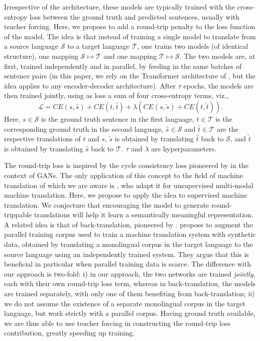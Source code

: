 \documentclass[11pt,a4paper]{article}
\begin{document}
Irrespective of the architecture, these models are typically trained with the cross-entropy loss between the ground truth and predicted sentences, usually with teacher forcing.
Here, we propose to add a round-trip penalty to the loss function of the model. The idea is that instead of training a single model to translate from a source language $\mathcal{S}$ to a target language $\mathcal{T}$, one trains two models (of identical structure), one mapping $\mathcal{S}\mapsto \mathcal{T}$ and one mapping $\mathcal{T}\mapsto \mathcal{S}$. The two models are, at first, trained independently and in parallel, by feeding in the same batches of sentence pairs (in this paper, we rely on the Transformer architecture of \citet{transformer}, but the idea applies to any encoder-decoder architecture). After $\tau$ epochs, the models are then trained jointly, using as loss a sum of four cross-entropy terms, viz.,
\begin{equation}
\mathcal{L} = CE(s, \hat{s}) + CE(t, \hat{t}) + \lambda \left( CE(s, \tilde{s}) + CE(t, \tilde{t})\right).
\label{eq:RTL}
\end{equation}
Here, $s\in\mathcal{S}$ is the ground truth sentence in the first language, $t\in\mathcal{T}$ is the corresponding ground truth in the second language, $\hat{s}\in\mathcal{S}$ and $\hat{t}\in\mathcal{T}$ are the respective translations of $t$ and $s$, $\tilde{s}$ is obtained by translating $\hat{t}$ back to $\mathcal{S}$, and $\tilde{t}$ is obtained by translating $\hat{s}$ back to $\mathcal{T}$. $\tau$ and $\lambda$ are hyperparameters. 

The round-trip loss is inspired by the cycle consistency loss pioneered by \citet{CycleGAN2017} in the context of GANs. The only application of this concept to the field of machine translation of which we are aware is \citet{su:2018}, who adapt it for unsupervised multi-modal machine translation. Here, we propose to apply the idea to supervised machine translation. We conjecture that encouraging the model to generate round-trippable translations will help it learn a semantically meaningful representation. A related idea is that of back-translation, pioneered by \citet{backtrans}. \citeauthor{backtrans} propose to augment the parallel training corpus used to train a machine translation system with synthetic data, obtained by translating a monolingual corpus in the target language to the source language using an independently trained system. They argue that this is beneficial in particular when parallel training data is scarce. The difference with our approach is two-fold: i) in our approach, the two networks are trained \emph{jointly}, each with their own round-trip loss term, whereas in back-translation, the models are trained separately, with only one of them benefiting from back-translation; ii) we do not assume the existence of a separate monolingual corpus in the target language, but work strictly with a parallel corpus. Having ground truth available, we are thus able to use teacher forcing in constructing the round-trip loss contribution, greatly speeding up training.
\end{document}
